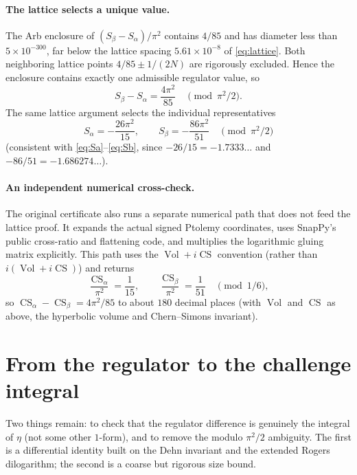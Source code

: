 \documentclass[11pt]{article}
\theoremstyle{definition}
\newcommand{\CS}{\operatorname{CS}}
\newcommand{\Vol}{\operatorname{Vol}}
\begin{document}
\paragraph{The lattice selects a unique value.}
The Arb enclosure of $(S_\beta-S_\alpha)/\pi^2$ contains $4/85$ and has
diameter less than $5\times10^{-300}$, far below the lattice spacing
$5.61\times10^{-8}$ of \eqref{eq:lattice}.  Both neighboring lattice points
$4/85\pm1/(2N)$ are rigorously excluded.  Hence the enclosure contains exactly
one admissible regulator value, so
\begin{equation}\label{eq:reg-difference}
 S_\beta-S_\alpha=\frac{4\pi^2}{85}
 \quad\pmod{\pi^2/2}.
\end{equation}
The same lattice argument selects the individual representatives
\[
 S_\alpha=-\frac{26\pi^2}{15},\qquad
 S_\beta=-\frac{86\pi^2}{51}
 \quad\pmod{\pi^2/2}
\]
(consistent with \eqref{eq:Sa}--\eqref{eq:Sb}, since $-26/15=-1.7333\ldots$ and
$-86/51=-1.686274\ldots$).

\paragraph{An independent numerical cross-check.}
The original certificate also runs a separate numerical path that does not feed the
lattice proof.  It expands the actual signed Ptolemy coordinates, uses SnapPy's
public cross-ratio and flattening code, and multiplies the logarithmic gluing
matrix explicitly.  This path uses the $\Vol+i\CS$ convention (rather than
$i(\Vol+i\CS)$) and returns
\[
 \frac{\CS_\alpha}{\pi^2}=\frac1{15},\qquad
 \frac{\CS_\beta}{\pi^2}=\frac1{51}
 \quad\pmod{1/6},
\]
so $\CS_\alpha-\CS_\beta=4\pi^2/85$ to about $180$ decimal places (with $\Vol$
and $\CS$ as above, the hyperbolic volume and Chern--Simons invariant).

\section{From the regulator to the challenge integral}\label{sec:variation}

Two things remain: to check that the regulator difference is genuinely the
integral of $\eta$ (not some other $1$-form), and to remove the modulo $\pi^2/2$
ambiguity.  The first is a differential identity built on the Dehn invariant and
the extended Rogers dilogarithm; the second is a coarse but rigorous size bound.
\end{document}
